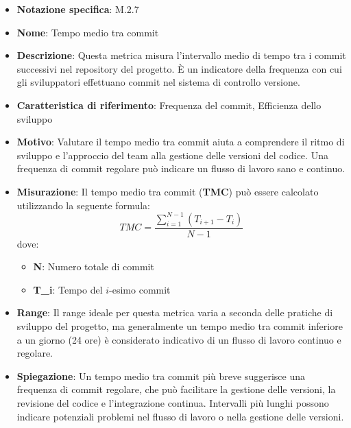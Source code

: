 \begin{itemize}
    \item \textbf{Notazione specifica}: M.2.7
    \item \textbf{Nome}: Tempo medio tra commit
    \item \textbf{Descrizione}: Questa metrica misura l'intervallo medio di tempo tra i commit successivi nel repository del progetto. È un indicatore della frequenza con cui gli sviluppatori effettuano commit nel sistema di controllo versione.
    \item \textbf{Caratteristica di riferimento}: Frequenza del commit, Efficienza dello sviluppo
    \item \textbf{Motivo}: Valutare il tempo medio tra commit aiuta a comprendere il ritmo di sviluppo e l'approccio del team alla gestione delle versioni del codice. Una frequenza di commit regolare può indicare un flusso di lavoro sano e continuo.
    \item \textbf{Misurazione}: Il tempo medio tra commit (\textbf{TMC}) può essere calcolato utilizzando la seguente formula:
    \[ TMC = \frac{\sum_{i=1}^{N-1} (T_{i+1} - T_i)}{N-1} \]
    dove:
    \begin{itemize}
        \item \textbf{N}: Numero totale di commit
        \item \textbf{T_i}: Tempo del \(i\)-esimo commit
    \end{itemize}
    \item \textbf{Range}: Il range ideale per questa metrica varia a seconda delle pratiche di sviluppo del progetto, ma generalmente un tempo medio tra commit inferiore a un giorno (24 ore) è considerato indicativo di un flusso di lavoro continuo e regolare.
    \item \textbf{Spiegazione}: Un tempo medio tra commit più breve suggerisce una frequenza di commit regolare, che può facilitare la gestione delle versioni, la revisione del codice e l'integrazione continua. Intervalli più lunghi possono indicare potenziali problemi nel flusso di lavoro o nella gestione delle versioni.
\end{itemize}
